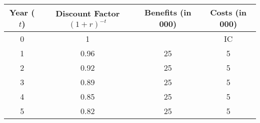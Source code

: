 \begin{tabular}{|c|c|c|c|}
\hline
\textbf{Year ($t$)} & \textbf{Discount Factor $(1+r)^{-t}$} & \textbf{Benefits (in 000)} & \textbf{Costs (in 000)} \\
\hline
0 & 1    &       & IC  \\
\hline
1 & 0.96 & 25    & 5   \\
\hline
2 & 0.92 & 25    & 5   \\
\hline
3 & 0.89 & 25    & 5   \\
\hline
4 & 0.85 & 25    & 5   \\
\hline
5 & 0.82 & 25    & 5   \\
\hline
\end{tabular}